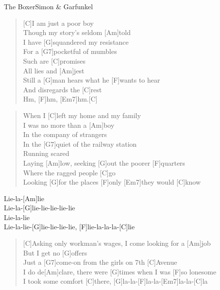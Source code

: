 \begin{song}{The Boxer}{Simon \& Garfunkel}

    \begin{verse}  
        [C]I am just a poor boy \\
        Though my story's seldom [Am]told \\
        I have [G]squandered my resistance \\
        For a [G7]pocketful of mumbles \\
        Such are [C]promises \\
        All lies and [Am]jest \\
        Still a [G]man hears what he [F]wants to hear \\
        And disregards the [C]rest \\
        [G]Hm, [F]hm, [Em7]hm.[C]
    \end{verse}  

    \begin{verse}  
        When I [C]left my home and my family \\
        I was no more than a [Am]boy \\
        In the company of strangers \\
        In the [G7]quiet of the railway station \\
        [C]Running scared \\
        Laying [Am]low, seeking [G]out the poorer [F]quarters \\
        Where the ragged people [C]go \\
        Looking [G]for the places [F]only [Em7]they would [C]know
    \end{verse}  

    \begin{chorus}  
        Lie-la-[Am]lie \\
        Lie-la-[G]lie-lie-lie-lie-lie \\
        Lie-la-lie \\
        [Am]Lie-la-lie-[G]lie-lie-lie-lie, [F]lie-la-la-la-[C]lie
    \end{chorus}  

    \begin{verse}  
        [C]Asking only workman's wages, I come looking for a [Am]job \\
        But I get no [G]offers \\
        Just a [G7]come-on from the girls on 7th [C]Avenue \\
        I do de[Am]clare, there were [G]times when I was [F]so lonesome \\
        I took some comfort [C]there, [G]la-la-[F]la-la-[Em7]la-la-[C]la
    \end{verse}  


\end{song}
